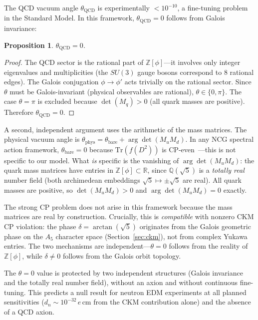 \documentclass[12pt,a4paper]{article}
\newtheorem{proposition}{Proposition}
\theoremstyle{definition}
\begin{document}
The QCD vacuum angle $\theta_{\text{QCD}}$ is experimentally $< 10^{-10}$, a fine-tuning problem in the Standard Model. In this framework, $\theta_{\text{QCD}} = 0$ follows from Galois invariance:

\begin{proposition}
$\theta_{\text{QCD}} = 0$.
\end{proposition}
\begin{proof}
The QCD sector is the rational part of $\mathbb{Z}[\phi]$---it involves only integer eigenvalues and multiplicities (the $SU(3)$ gauge bosons correspond to 8 rational edges). The Galois conjugation $\phi \to \phi'$ acts trivially on the rational sector. Since $\theta$ must be Galois-invariant (physical observables are rational), $\theta \in \{0, \pi\}$. The case $\theta = \pi$ is excluded because $\det(M_q) > 0$ (all quark masses are positive). Therefore $\theta_{\text{QCD}} = 0$.
\end{proof}

A second, independent argument uses the arithmetic of the mass matrices.  The physical vacuum angle is $\theta_{\text{phys}} = \theta_{\text{bare}} + \arg\det(M_u M_d)$.  In any NCG spectral action framework, $\theta_{\text{bare}} = 0$ because $\mathrm{Tr}(f(D^2))$ is CP-even~\cite{chamseddine1997}---this is not specific to our model.  What \emph{is} specific is the vanishing of $\arg\det(M_u M_d)$: the quark mass matrices have entries in $\mathbb{Z}[\phi] \subset \mathbb{R}$, since $\mathbb{Q}(\sqrt{5})$ is a \emph{totally real} number field (both archimedean embeddings $\sqrt{5} \mapsto \pm\sqrt{5}$ are real).  All quark masses are positive, so $\det(M_u M_d) > 0$ and $\arg\det(M_u M_d) = 0$ exactly.

The strong CP problem does not arise in this framework because the mass matrices are real by construction.  Crucially, this is \emph{compatible} with nonzero CKM CP violation: the phase $\delta = \arctan(\sqrt{5})$ originates from the Galois geometric phase on the $A_5$ character space (Section~\ref{sec:ckm}), not from complex Yukawa entries.  The two mechanisms are independent---$\theta = 0$ follows from the reality of $\mathbb{Z}[\phi]$, while $\delta \neq 0$ follows from the Galois orbit topology.

The $\theta = 0$ value is protected by two independent structures (Galois invariance and the totally real number field), without an axion and without continuous fine-tuning.  This predicts a null result for neutron EDM experiments at all planned sensitivities ($d_n \sim 10^{-32}\,e\,\text{cm}$ from the CKM contribution alone) and the absence of a QCD axion.
\end{document}
